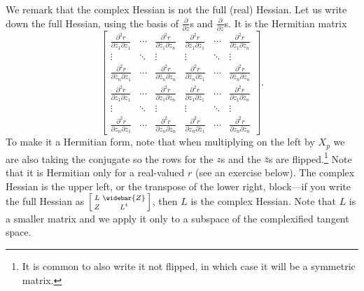 \documentclass[12pt,openany]{book}
\theoremstyle{plain}
\theoremstyle{remark}
\theoremstyle{definition}
\theoremstyle{exercise}
\theoremstyle{example}
\begin{document}
We remark that the complex Hessian is not the full (real) Hessian.
Let us write down the full Hessian, using the
basis of $\frac{\partial}{\partial z}$s and
$\frac{\partial}{\partial \bar{z}}$s.  It is
the Hermitian matrix
\begin{equation*}
\begin{bmatrix}
\frac{\partial^2 r}{\partial \bar{z}_1 \partial z_1}
& \cdots &
\frac{\partial^2 r}{\partial \bar{z}_1 \partial z_n}
&
\frac{\partial^2 r}{\partial \bar{z}_1 \partial \bar{z}_1}
& \cdots &
\frac{\partial^2 r}{\partial \bar{z}_1 \partial \bar{z}_n}
\\
\vdots & \ddots & \vdots & \vdots & \ddots & \vdots
\\
\frac{\partial^2 r}{\partial \bar{z}_n \partial z_1}
& \cdots &
\frac{\partial^2 r}{\partial \bar{z}_n \partial z_n}
&
\frac{\partial^2 r}{\partial \bar{z}_n \partial \bar{z}_1}
& \cdots &
\frac{\partial^2 r}{\partial \bar{z}_n \partial \bar{z}_n}
\\[4pt]
\frac{\partial^2 r}{\partial z_1 \partial z_1}
& \cdots &
\frac{\partial^2 r}{\partial z_1 \partial z_n}
&
\frac{\partial^2 r}{\partial z_1 \partial \bar{z}_1}
& \cdots &
\frac{\partial^2 r}{\partial z_1 \partial \bar{z}_n}
\\
\vdots & \ddots & \vdots & \vdots & \ddots & \vdots
\\
\frac{\partial^2 r}{\partial z_n \partial z_1}
& \cdots &
\frac{\partial^2 r}{\partial z_n \partial z_n}
&
\frac{\partial^2 r}{\partial z_n \partial \bar{z}_1}
& \cdots &
\frac{\partial^2 r}{\partial z_n \partial \bar{z}_n}
\end{bmatrix}
.
\end{equation*}
To make it a Hermitian form, note that when multiplying on the left by $X_p$
we are also taking the conjugate so the rows for the $z$s and the $\bar{z}$s
are flipped.\footnote{It is common to also write it not flipped, in which case it
will be a symmetric matrix.}
Note that it is Hermitian only for a real-valued $r$ (see an exercise below).
The complex Hessian is the upper left,
or the transpose of the lower right, block---if you write the full Hessian as
$\Bigl[ \begin{smallmatrix} L & \widebar{Z} \\ Z & L^t \end{smallmatrix}
\Bigr]$, then $L$ is the complex Hessian.
Note that $L$ is a smaller matrix and we apply it only to a subspace
of the complexified tangent space.
\end{document}
